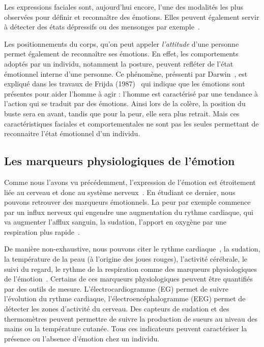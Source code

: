 Les expressions faciales sont, aujourd'hui encore, l'une des modalités les plus observées pour définir et reconnaître des émotions. Elles peuvent également servir à détecter des états dépressifs ou des mensonges par exemple~\cite{Suslow2001,Owayjan2012}.

Les positionnements du corps, qu'on peut appeler \textit{l'attitude} d'une personne permet également de reconnaître ses émotions. En effet, les comportements adoptés par un individu, notamment la posture, peuvent refléter de l'état émotionnel interne d'une personne. Ce phénomène, préssenti par Darwin~\cite{Darwin1872}, est expliqué dans les travaux de Frijda (1987)~\cite{Frijda1987} qui indique que les émotions sont présentes pour aider l'homme à agir : l'homme est caractérisé par une tendance à l'action qui se traduit par des émotions. Ainsi lors de la colère, la position du buste sera en avant, tandis que pour la peur, elle sera plus retrait. Mais ces caractéristiques faciales et comportementales ne sont pas les seules permettant de reconnaitre l'état émotionnel d'un individu.

\subsection{Les marqueurs physiologiques de l'émotion}
Comme nous l'avons vu précédemment, l'expression de l'émotion est étroitement liée au cerveau et donc au système nerveux~\cite{Dantzer2002}. En étudiant ce dernier, nous pouvons retrouver des marqueurs émotionnels. La peur par exemple commence par un influx nerveux qui engendre une augmentation du rythme cardiaque, qui va augmenter l'afflux sanguin, la sudation, l'apport en oxygène par une respiration plus rapide~\cite{Steimer2002}.

De manière non-exhaustive, nous pouvons citer le rythme cardiaque~\cite{Wiens2000}, la sudation, la température de la peau (à l'origine des joues rouges), l'activité cérébrale, le suivi du regard, le rythme de la respiration comme des marqueurs physiologiques de l'émotion~\cite{Maaoui2010,Levenson2003}. Certains de ces marqueurs physiologiques peuvent être quantifiés par des outils de mesure. L'électrocardiogramme (EG) permet de suivre l'évolution du rythme cardiaque, l'électroencéphalogramme (EEG) permet de détecter les zones d'activité du cerveau. Des capteurs de sudation et des thermomètres peuvent permettre de suivre la production de sueurs au niveau des mains ou la température cutanée. Tous ces indicateurs peuvent caractériser la présence ou l'absence d'émotion chez un individu.

